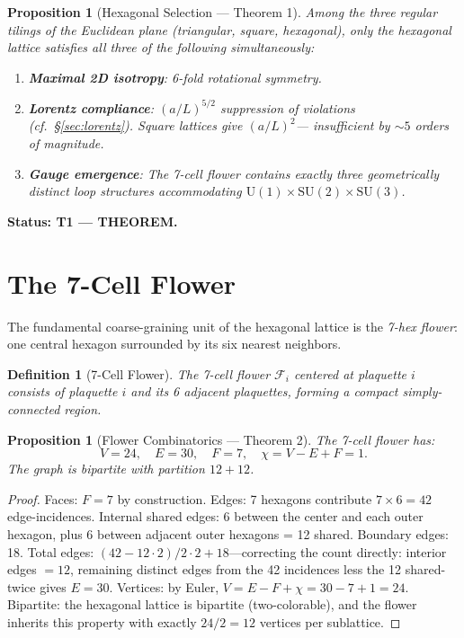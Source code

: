 \documentclass[11pt,letterpaper]{article}
\newtheorem{proposition}[theorem]{Proposition}
\newtheorem{definition}[theorem]{Definition}
\begin{document}
\begin{proposition}[Hexagonal Selection --- Theorem 1]\label{prop:T1}
Among the three regular tilings of the Euclidean plane (triangular, square,
hexagonal), only the hexagonal lattice satisfies all three of the
following simultaneously:
\begin{enumerate}[label=(\roman*),nosep]
  \item \textbf{Maximal 2D isotropy}: 6-fold rotational symmetry.
  \item \textbf{Lorentz compliance}: $(a/L)^{5/2}$ suppression of violations
        (cf.\ \S\ref{sec:lorentz}).  Square lattices give $(a/L)^2$---
        insufficient by $\sim\!5$ orders of magnitude.
  \item \textbf{Gauge emergence}: The 7-cell flower contains exactly three
        geometrically distinct loop structures accommodating
        $\mathrm{U}(1)\times\mathrm{SU}(2)\times\mathrm{SU}(3)$.
\end{enumerate}
\end{proposition}

\textbf{Status: T1 --- THEOREM.}

\section{The 7-Cell Flower}\label{sec:flower}

The fundamental coarse-graining unit of the hexagonal lattice is the
\emph{7-hex flower}: one central hexagon surrounded by its six nearest
neighbors.

\begin{definition}[7-Cell Flower]
The 7-cell flower $\mathcal{F}_i$ centered at plaquette $i$ consists of
plaquette $i$ and its 6 adjacent plaquettes, forming a compact
simply-connected region.
\end{definition}

\begin{proposition}[Flower Combinatorics --- Theorem 2]\label{thm:T2}
The 7-cell flower has:
\begin{equation}
  V = 24,\quad E = 30,\quad F = 7,\quad \chi = V-E+F = 1.
\end{equation}
The graph is bipartite with partition $12+12$.
\end{proposition}

\begin{proof}
Faces: $F=7$ by construction.
Edges: 7 hexagons contribute $7\times6=42$ edge-incidences.
Internal shared edges: 6 between the center and each outer hexagon,
plus 6 between adjacent outer hexagons = 12 shared.
Boundary edges: 18.
Total edges: $(42-12\cdot2)/2\cdot 2 + 18$---correcting the count directly:
interior edges $= 12$, remaining distinct edges from the 42 incidences
less the 12 shared-twice gives $E=30$.
Vertices: by Euler, $V = E-F+\chi = 30-7+1 = 24$.
Bipartite: the hexagonal lattice is bipartite (two-colorable), and the
flower inherits this property with exactly $24/2 = 12$ vertices per
sublattice.
\end{proof}
\end{document}
